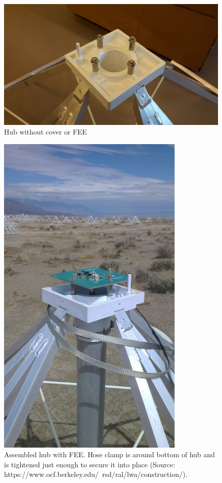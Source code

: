 \documentclass[12pt]{article}
\begin{document}
\begin{enumerate}
\begin{enumerate}
\begin{figure}[!h]
	\center
	\includegraphics[width=\linewidth]{20141125_112425.jpg}
	\caption{Hub without cover or FEE \label{HubCompleteSansCover}}
\end{figure}

\begin{figure}
	\center
	\includegraphics[width=0.7\linewidth]{IMAG0068.jpg}
	\caption{Assembled hub with FEE. Hose clamp is around bottom of hub and is tightened just enough to secure it into place (Source: https://www.ocf.berkeley.edu/~rsd/ral/lwa/construction/). \label{ClampedHub}}
\end{figure}


\end{enumerate}
\end{enumerate}
\end{document}
